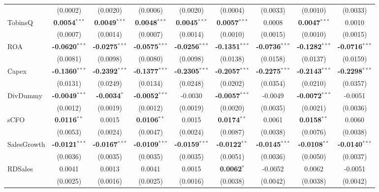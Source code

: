 \documentclass[11pt,a4paper]{article}
\begin{document}
\begin{table}[htbp]
\begin{tabular}{lcccccccc}
 & (0.0002) & (0.0020) & (0.0006) & (0.0020) & (0.0004) & (0.0033) & (0.0010) & (0.0033) \\
TobinsQ & \textbf{0.0054}$^{***}$ & \textbf{0.0049}$^{***}$ & \textbf{0.0048}$^{***}$ & \textbf{0.0045}$^{***}$ & \textbf{0.0057}$^{***}$ & 0.0008 & \textbf{0.0047}$^{***}$ & 0.0010 \\
 & (0.0007) & (0.0014) & (0.0007) & (0.0014) & (0.0010) & (0.0015) & (0.0010) & (0.0015) \\
ROA & \textbf{-0.0620}$^{***}$ & \textbf{-0.0275}$^{***}$ & \textbf{-0.0575}$^{***}$ & \textbf{-0.0256}$^{***}$ & \textbf{-0.1351}$^{***}$ & \textbf{-0.0736}$^{***}$ & \textbf{-0.1282}$^{***}$ & \textbf{-0.0716}$^{***}$ \\
 & (0.0081) & (0.0098) & (0.0080) & (0.0098) & (0.0138) & (0.0158) & (0.0137) & (0.0159) \\
Capex & \textbf{-0.1360}$^{***}$ & \textbf{-0.2392}$^{***}$ & \textbf{-0.1377}$^{***}$ & \textbf{-0.2305}$^{***}$ & \textbf{-0.2057}$^{***}$ & \textbf{-0.2275}$^{***}$ & \textbf{-0.2143}$^{***}$ & \textbf{-0.2298}$^{***}$ \\
 & (0.0131) & (0.0249) & (0.0134) & (0.0248) & (0.0202) & (0.0354) & (0.0210) & (0.0357) \\
DivDummy & \textbf{-0.0049}$^{***}$ & \textbf{-0.0034}$^{*}$ & \textbf{-0.0052}$^{***}$ & -0.0030 & \textbf{-0.0057}$^{***}$ & -0.0049 & \textbf{-0.0072}$^{***}$ & -0.0051 \\
 & (0.0012) & (0.0019) & (0.0012) & (0.0019) & (0.0020) & (0.0035) & (0.0021) & (0.0036) \\
sCFO & \textbf{0.0116}$^{**}$ & 0.0015 & \textbf{0.0106}$^{**}$ & 0.0015 & \textbf{0.0174}$^{**}$ & 0.0061 & \textbf{0.0158}$^{**}$ & 0.0060 \\
 & (0.0053) & (0.0024) & (0.0047) & (0.0024) & (0.0087) & (0.0038) & (0.0076) & (0.0038) \\
SalesGrowth & \textbf{-0.0121}$^{***}$ & \textbf{-0.0167}$^{***}$ & \textbf{-0.0109}$^{***}$ & \textbf{-0.0159}$^{***}$ & \textbf{-0.0122}$^{**}$ & \textbf{-0.0145}$^{***}$ & \textbf{-0.0108}$^{**}$ & \textbf{-0.0140}$^{***}$ \\
 & (0.0036) & (0.0035) & (0.0035) & (0.0035) & (0.0051) & (0.0036) & (0.0050) & (0.0037) \\
RDSales & 0.0041 & 0.0013 & 0.0041 & 0.0015 & \textbf{0.0062}$^{*}$ & -0.0052 & 0.0062 & -0.0051 \\
 & (0.0025) & (0.0016) & (0.0025) & (0.0016) & (0.0038) & (0.0042) & (0.0038) & (0.0042) \\

\end{tabular}
\end{table}
\end{document}
